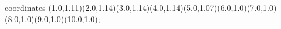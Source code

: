 					coordinates { (1.0,1.11)(2.0,1.14)(3.0,1.14)(4.0,1.14)(5.0,1.07)(6.0,1.0)(7.0,1.0)(8.0,1.0)(9.0,1.0)(10.0,1.0)};